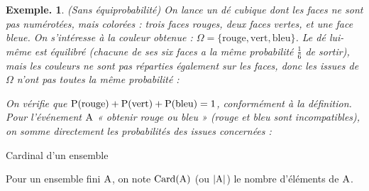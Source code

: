 \documentclass[12pt]{article}
\theoremstyle{break}
\newtheorem*{example}{Exemple.}
\begin{document}
\begin{example}(Sans équiprobabilité)
On lance un dé cubique dont les faces ne sont pas numérotées, mais colorées : trois faces rouges, deux faces vertes, et une face bleue. On s'intéresse à la couleur obtenue : $\Omega = \{\text{rouge}, \text{vert}, \text{bleu}\}$. Le dé lui-même est équilibré (chacune de ses six faces a la même probabilité $\frac16$ de sortir), mais les couleurs ne sont pas réparties également sur les faces, donc les issues de $\Omega$ n'ont pas toutes la même probabilité :

  \vspace{0.2em}
  \framebox[1\linewidth]{\parbox{5.5in}{%
  \[
  \hideMW{\P(\text{rouge}) = \frac{3}{6} = 0{,}5, \qquad \P(\text{vert}) = \frac{2}{6} = \frac13, \qquad P(\text{bleu}) = \frac{1}{6}.}
  \]
  \vspace{-1em}
  }}
\begin{center}
\end{center}

On vérifie que $\P(\text{rouge})+\P(\text{vert})+\P(\text{bleu})=1$, conformément à la définition. Pour l'événement $\A$ « obtenir rouge ou bleu » (rouge et bleu sont incompatibles), on somme directement les probabilités des issues concernées :
\begin{center}
  \vspace{0.2em}
  \framebox[1\linewidth]{\parbox{5.5in}{%
  \[
  \hideMW{\P(\A) = \P(\text{rouge})+\ \P(\text{bleu}) = 0{,}5+\frac16 = \frac23.}
  \]
  \vspace{-1em}
  }}
\end{center}
\end{example}

 
\begin{definition}{Cardinal d'un ensemble}{}
  \begin{multihide}
  Pour un ensemble fini $\A$, on note $\mathrm{Card}(\A)$ (ou $|\A|$) le nombre d'éléments de $\A$.
  \end{multihide}
\end{definition}
 
\end{document}
